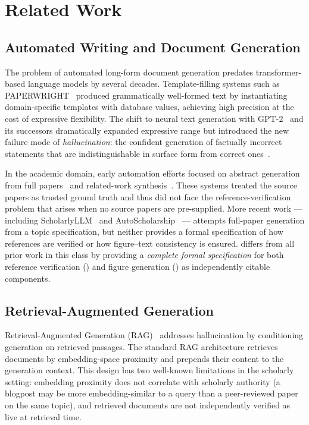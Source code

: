 \section{Related Work}
\label{sec:related}

\subsection{Automated Writing and Document Generation}

The problem of automated long-form document generation predates transformer-based language
models by several decades.
Template-filling systems such as PAPERWRIGHT~\cite{reiter1997building} produced
grammatically well-formed text by instantiating domain-specific templates with
database values, achieving high precision at the cost of expressive flexibility.
The shift to neural text generation with GPT-2~\cite{radford2019language} and its successors
dramatically expanded expressive range but introduced the new failure mode of \emph{hallucination}:
the confident generation of factually incorrect statements that are indistinguishable in
surface form from correct ones~\cite{maynez2020faithfulness}.

In the academic domain, early automation efforts focused on abstract generation from full
papers~\cite{cohan2018discourse} and related-work synthesis~\cite{hoang2010towards}.
These systems treated the source papers as trusted ground truth and thus did not face the
reference-verification problem that arises when no source papers are pre-supplied.
More recent work — including ScholarlyLLM~\cite{agrawal2024scholarlyllm} and
AutoScholarship~\cite{li2024autoscholarship} — attempts full-paper generation from a
topic specification, but neither provides a formal specification of how references are
verified or how figure–text consistency is ensured.
\sys{} differs from all prior work in this class by providing a \emph{complete formal
specification} for both reference verification (\cgrag{}) and figure generation (\tvg{})
as independently citable components.

\subsection{Retrieval-Augmented Generation}

Retrieval-Augmented Generation (RAG)~\cite{lewis2020retrieval} addresses hallucination by
conditioning generation on retrieved passages.
The standard RAG architecture retrieves documents by embedding-space proximity and prepends
their content to the generation context.
This design has two well-known limitations in the scholarly setting:
embedding proximity does not correlate with scholarly authority (a blogpost may be more
embedding-similar to a query than a peer-reviewed paper on the same topic), and
retrieved documents are not independently verified as live at retrieval time.

